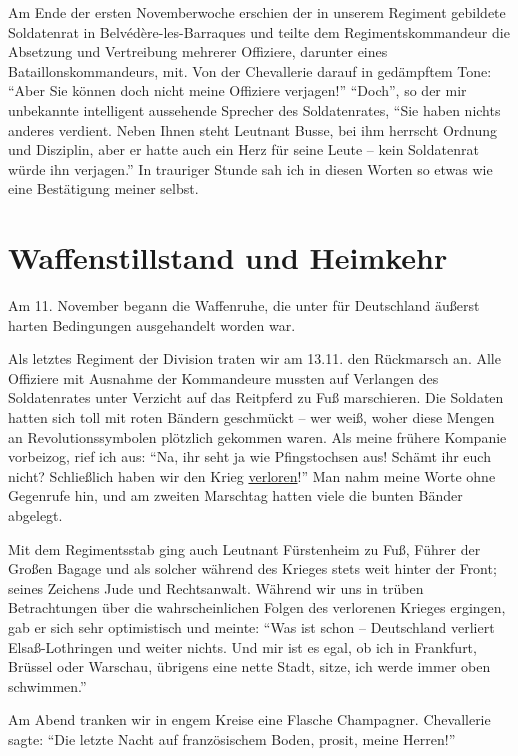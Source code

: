 Am Ende der ersten Novemberwoche erschien der in unserem Regiment gebildete Soldatenrat in Belvédère-les-Barraques und teilte dem Regimentskommandeur die Absetzung und Vertreibung mehrerer Offiziere, darunter eines Bataillonskommandeurs, mit. Von der Chevallerie darauf in gedämpftem Tone: \enquote{Aber Sie können doch nicht meine Offiziere verjagen!} \enquote{Doch}, so der mir unbekannte intelligent aussehende Sprecher des Soldatenrates, \enquote{Sie haben nichts anderes verdient. Neben Ihnen steht Leutnant Busse, bei ihm herrscht Ordnung und Disziplin, aber er hatte auch ein Herz für seine Leute -- kein Soldatenrat würde ihn verjagen.} In trauriger Stunde sah ich in diesen Worten so etwas wie eine Bestätigung meiner selbst.

\section{Waffenstillstand und Heimkehr}

Am 11. November begann die Waffenruhe, die unter für Deutschland äußerst harten Bedingungen ausgehandelt worden war.

Als letztes Regiment der Division traten wir am 13.11. den Rückmarsch an. Alle Offiziere mit Ausnahme der Kommandeure mussten auf Verlangen des Soldatenrates unter Verzicht auf das Reitpferd zu Fuß marschieren. Die Soldaten hatten sich toll mit roten Bändern geschmückt -- wer weiß, woher diese Mengen an Revolutionssymbolen plötzlich gekommen waren. Als meine frühere Kompanie vorbeizog, rief ich aus: \enquote{Na, ihr seht ja wie Pfingstochsen aus! Schämt ihr euch nicht? Schließlich haben wir den Krieg \underline{verloren}!} Man nahm meine Worte ohne Gegenrufe hin, und am zweiten Marschtag hatten viele die bunten Bänder abgelegt.

Mit dem Regimentsstab ging auch Leutnant Fürstenheim zu Fuß, Führer der Großen Bagage und als solcher während des Krieges stets weit hinter der Front; seines Zeichens Jude und Rechtsanwalt. Während wir uns in trüben Betrachtungen über die wahrscheinlichen Folgen des verlorenen Krieges ergingen, gab er sich sehr optimistisch und meinte: \enquote{Was ist schon -- Deutschland verliert Elsaß-Lothringen und weiter nichts. Und mir ist es egal, ob ich in Frankfurt, Brüssel oder Warschau, übrigens eine nette Stadt, sitze, ich werde immer oben schwimmen.}

Am Abend tranken wir in engem Kreise eine Flasche Champagner. Chevallerie sagte: \enquote{Die letzte Nacht auf französischem Boden, prosit, meine Herren!}

